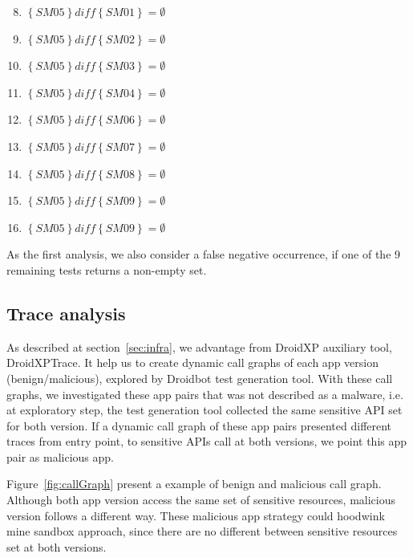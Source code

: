 \begin{enumerate}[(Test 1)] \setcounter{enumi}{7}
 \item {$\left\{SM05\right\} \textit{diff} \left\{SM01\right\} = \emptyset$}
 \item {$\left\{SM05\right\} \textit{diff} \left\{SM02\right\} = \emptyset$}
 \item {$\left\{SM05\right\} \textit{diff} \left\{SM03\right\} = \emptyset$}
 \item {$\left\{SM05\right\} \textit{diff} \left\{SM04\right\} = \emptyset$}
 \item {$\left\{SM05\right\} \textit{diff} \left\{SM06\right\} = \emptyset$}
 \item {$\left\{SM05\right\} \textit{diff} \left\{SM07\right\} = \emptyset$}
 \item {$\left\{SM05\right\} \textit{diff} \left\{SM08\right\} = \emptyset$}
 \item {$\left\{SM05\right\} \textit{diff} \left\{SM09\right\} = \emptyset$}
 \item {$\left\{SM05\right\} \textit{diff} \left\{SM09\right\} = \emptyset$}
\end{enumerate}

As the first analysis, we also consider a false negative occurrence, if one of the 9 remaining tests returns a non-empty set.

\subsection{Trace analysis} \label{sec:pathsetup}

As described at section~\ref{sec:infra}, we advantage from DroidXP auxiliary tool, DroidXPTrace. It help us to create dynamic call graphs of each app version (benign/malicious), explored by Droidbot test generation tool. With these call graphs, we investigated these app pairs that was not described as a malware, i.e. at exploratory step, the test generation tool collected the same sensitive API set for both version. If a dynamic call graph of these app pairs presented different traces from entry point, to sensitive APIs call at both versions, we point this app pair as malicious app.

Figure~\ref{fig:callGraph} present a example of benign and malicious call graph. Although both app version access the same set of sensitive resources, malicious version follows a different way. These malicious app strategy could hoodwink mine sandbox approach, since there are no different between sensitive resources set at both versions.


